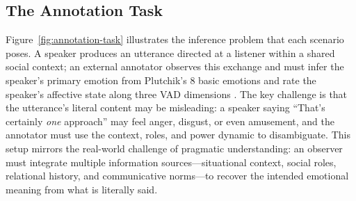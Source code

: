 \documentclass[twoside,11pt]{article}
\begin{document}
\subsection{The Annotation Task}

Figure~\ref{fig:annotation-task} illustrates the inference problem that each scenario poses. A speaker produces an utterance directed at a listener within a shared social context; an external annotator observes this exchange and must infer the speaker's primary emotion from Plutchik's 8 basic emotions \citep{plutchik1980general} and rate the speaker's affective state along three VAD dimensions \citep{mehrabian1996pleasure,russell1980circumplex}. The key challenge is that the utterance's literal content may be misleading: a speaker saying ``That's certainly \textit{one} approach'' may feel anger, disgust, or even amusement, and the annotator must use the context, roles, and power dynamic to disambiguate. This setup mirrors the real-world challenge of pragmatic understanding: an observer must integrate multiple information sources---situational context, social roles, relational history, and communicative norms---to recover the intended emotional meaning from what is literally said.
\end{document}
